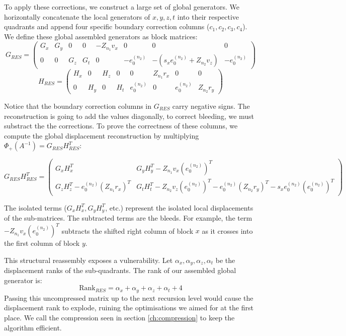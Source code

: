 To apply these corrections, we construct a large set of global generators.
We horizontally concatenate the local generators of $x, y, z, t$ into
their respective quadrants and append four specific boundary
correction columns ($c_1, c_2, c_3, c_4$).
We define these global assembled generators as block matrices:
$$ G_{RES} =
\begin{pmatrix}
  G_x & G_y & 0 & 0 & -Z_{n_1} v_x & 0 & 0 & 0 \\
  0 & 0 & G_z & G_t & 0 & -e_0^{(n_2)} & -(s_x e_0^{(n_2)} + Z_{n_2}
  v_z) & -e_0^{(n_2)}
\end{pmatrix} $$
$$ H_{RES} =
\begin{pmatrix}
  H_x & 0 & H_z & 0 & 0 & Z_{n_1} r_x & 0 & 0 \\
  0 & H_y & 0 & H_t & e_0^{(n_2)} & 0 & e_0^{(n_2)} & Z_{n_2} r_y
\end{pmatrix} $$

Notice that the boundary correction columns in $G_{RES}$ carry negative signs.
The reconstruction is going to add the values diagonally, to correct
bleeding, we must
substract the the corrections.
To prove the correctness of these columns,
we compute the global displacement reconstruction by multiplying
$\Phi_+(A^{-1}) = G_{RES} H_{RES}^T$:

$$ G_{RES} H_{RES}^T =
\begin{pmatrix}
  G_x H_x^T                               & G_y H_y^T - Z_{n_1} v_x
  (e_0^{(n_2)})^T \\
  G_z H_z^T - e_0^{(n_2)} (Z_{n_1} r_x)^T & G_t H_t^T - Z_{n_2} v_z
  (e_0^{(n_2)})^T - e_0^{(n_2)} (Z_{n_2} r_y)^T - s_x e_0^{(n_2)}
  (e_0^{(n_2)})^T
\end{pmatrix} $$

The isolated terms ($G_x H_x^T, G_y H_y^T$, etc.) represent the
isolated local displacements of the sub-matrices.
The subtracted terms are the bleeds.
For example, the term $- Z_{n_1} v_x (e_0^{(n_2)})^T$ subtracts the
shifted right column of block $x$ as it crosses into the first column
of block $y$.

This structural reassembly exposes a vulnerability. Let $\alpha_x,
\alpha_y, \alpha_z, \alpha_t$ be the displacement ranks of the sub-quadrants.
The rank of our assembled global generator is:
$$ \text{Rank}_{RES} = \alpha_x + \alpha_y + \alpha_z + \alpha_t + 4 $$
Passing this uncompressed matrix up to the next recursion level would
cause the displacement rank to explode,
ruining the optimisations we aimed for at the first place. We call
the compression seen in section \ref{ch:compression} to keep the
algorithm efficient.

